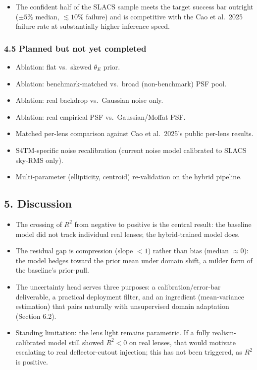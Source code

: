 \documentclass[
  11pt,
]{article}
\providecommand{\tightlist}{%
  \setlength{\itemsep}{0pt}\setlength{\parskip}{0pt}}
\begin{document}
\begin{itemize}
\tightlist
\item
  The confident half of the SLACS sample meets the target success bar
  outright (\(\pm 5\%\) median, \(\lesssim 10\%\) failure) and is
  competitive with the Cao et al.~2025 failure rate at substantially
  higher inference speed.
\end{itemize}

\hypertarget{planned-but-not-yet-completed}{%
\subsubsection{4.5 Planned but not yet
completed}\label{planned-but-not-yet-completed}}

\begin{itemize}
\tightlist
\item
  Ablation: flat vs.~skewed \(\theta_E\) prior.
\item
  Ablation: benchmark-matched vs.~broad (non-benchmark) PSF pool.
\item
  Ablation: real backdrop vs.~Gaussian noise only.
\item
  Ablation: real empirical PSF vs.~Gaussian/Moffat PSF.
\item
  Matched per-lens comparison against Cao et al.~2025's public per-lens
  results.
\item
  S4TM-specific noise recalibration (current noise model calibrated to
  SLACS sky-RMS only).
\item
  Multi-parameter (ellipticity, centroid) re-validation on the hybrid
  pipeline.
\end{itemize}

\hypertarget{discussion}{%
\subsection{5. Discussion}\label{discussion}}

\begin{itemize}
\tightlist
\item
  The crossing of \(R^2\) from negative to positive is the central
  result: the baseline model did not track individual real lenses; the
  hybrid-trained model does.
\item
  The residual gap is compression (slope \(<1\)) rather than bias
  (median \(\approx 0\)): the model hedges toward the prior mean under
  domain shift, a milder form of the baseline's prior-pull.
\item
  The uncertainty head serves three purposes: a calibration/error-bar
  deliverable, a practical deployment filter, and an ingredient
  (mean-variance estimation) that pairs naturally with unsupervised
  domain adaptation (Section 6.2).
\item
  Standing limitation: the lens light remains parametric. If a fully
  realism-calibrated model still showed \(R^2 < 0\) on real lenses, that
  would motivate escalating to real deflector-cutout injection; this has
  not been triggered, as \(R^2\) is positive.
\end{itemize}
\end{document}
